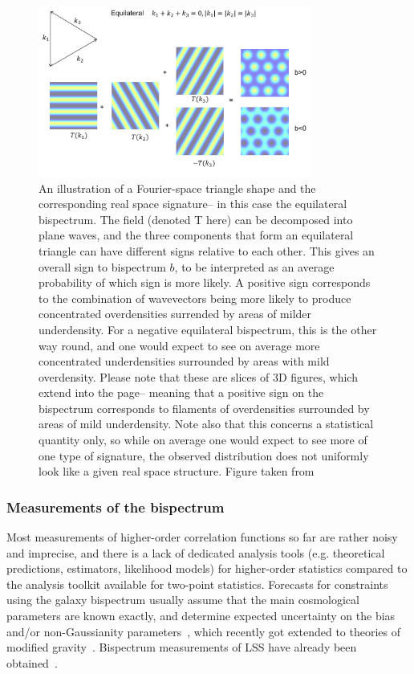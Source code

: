 \begin{figure}[!ht]
	\centering
	\includegraphics[width=0.8\textwidth]{fig/Equilateral.png}
	\caption{An illustration of a Fourier-space triangle shape and the corresponding real space signature-- in this case the equilateral bispectrum. The field (denoted T here) can be decomposed into plane waves, and the three components that form an equilateral triangle can have different signs relative to each other. This gives an overall sign to bispectrum $b$, to be interpreted as an average probability of which sign is more likely. A positive sign corresponds to the combination of wavevectors being more likely to produce concentrated overdensities surrended by areas of milder underdensity. For a negative equilateral bispectrum, this is the other way round, and one would expect to see on average more concentrated underdensities surrounded by areas with mild overdensity. Please note that these are slices of 3D figures, which extend into the page-- meaning that a positive sign on the bispectrum corresponds to filaments of overdensities surrounded by areas of mild underdensity. Note also that this concerns a statistical quantity only, so while on average one would expect to see more of one type of signature, the observed distribution does not uniformly look like a given real space structure. Figure taken from~\cite{Lewis:2011}}
	\label{fig:realspacesignature}
\end{figure}

\subsubsection{Measurements of the bispectrum}

Most measurements of higher-order correlation functions so far are rather noisy and imprecise, and there is a lack of dedicated analysis tools (e.g. theoretical predictions, estimators, likelihood models) for higher-order statistics compared to the analysis toolkit available for two-point statistics. Forecasts for constraints using the galaxy bispectrum usually assume that the main cosmological parameters are known exactly, and determine expected uncertainty on the bias and/or non-Gaussianity parameters~\cite{Scoccimarro:2003wn,Sefusatti:2007ih,Song:2015gca,Tellarini:2016sgp,Yamauchi:2016wuc,Karagiannis:2018jdt}, which recently got extended to theories of modified gravity~\cite{Yamauchi:2017ibz}. Bispectrum measurements of LSS have already been obtained~\cite{Scoccimarro:2000sp,Feldman:2000vk,WiggleZ:2013kor,Gil-Marin:2014pva,Gil-Marin:2016wya,Verde:2001sf}.

